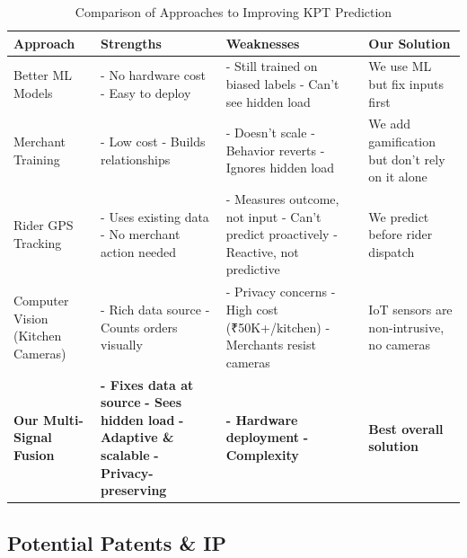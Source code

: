 \documentclass[11pt,a4paper]{article}
\begin{document}
\begin{table}[H]
\centering
\caption{Comparison of Approaches to Improving KPT Prediction}
\footnotesize
\begin{tabular}{@{}p{3cm}p{3cm}p{3cm}p{3cm}@{}}
\toprule
\textbf{Approach} & \textbf{Strengths} & \textbf{Weaknesses} & \textbf{Our Solution} \\ \midrule

Better ML Models & 
- No hardware cost 
- Easy to deploy & 
- Still trained on biased labels
- Can't see hidden load & 
We use ML but fix inputs first \\
\midrule

Merchant Training & 
- Low cost
- Builds relationships & 
- Doesn't scale
- Behavior reverts
- Ignores hidden load & 
We add gamification but don't rely on it alone \\
\midrule

Rider GPS Tracking &
- Uses existing data
- No merchant action needed &
- Measures outcome, not input
- Can't predict proactively
- Reactive, not predictive &
We predict before rider dispatch \\
\midrule

Computer Vision (Kitchen Cameras) &
- Rich data source
- Counts orders visually &
- Privacy concerns
- High cost (₹50K+/kitchen)
- Merchants resist cameras &
IoT sensors are non-intrusive, no cameras \\
\midrule

\textbf{Our Multi-Signal Fusion} &
\textbf{- Fixes data at source}
\textbf{- Sees hidden load}
\textbf{- Adaptive \& scalable}
\textbf{- Privacy-preserving} &
\textbf{- Hardware deployment}
\textbf{- Complexity} &
\textbf{Best overall solution} \\
\bottomrule
\end{tabular}
\end{table}

\subsection{Potential Patents \& IP}
\end{document}
